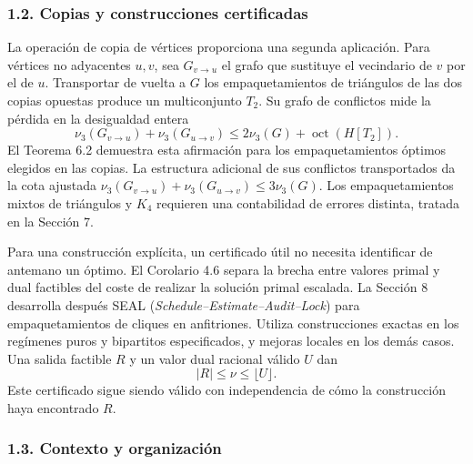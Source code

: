 \documentclass[spanish,11pt,a4paper]{article}
\begin{document}
\subsubsection{1.2. Copias y construcciones
certificadas}\label{copias-y-construcciones-certificadas}

La operación de copia de vértices proporciona una segunda aplicación.
Para vértices no adyacentes \(u,v\), sea \(G_{v\to u}\) el grafo que
sustituye el vecindario de \(v\) por el de \(u\). Transportar de vuelta
a \(G\) los empaquetamientos de triángulos de las dos copias opuestas
produce un multiconjunto \(T_2\). Su grafo de conflictos mide la pérdida
en la desigualdad entera \[
\nu_3(G_{v\to u})+\nu_3(G_{u\to v})
\le 2\nu_3(G)+\operatorname{oct}(H[T_2]).
\] El Teorema 6.2 demuestra esta afirmación para los empaquetamientos
óptimos elegidos en las copias. La estructura adicional de sus
conflictos transportados da la cota ajustada
\(\nu_3(G_{v\to u})+\nu_3(G_{u\to v})\le3\nu_3(G)\). Los
empaquetamientos mixtos de triángulos y \(K_4\) requieren una
contabilidad de errores distinta, tratada en la Sección 7.

Para una construcción explícita, un certificado útil no necesita
identificar de antemano un óptimo. El Corolario 4.6 separa la brecha
entre valores primal y dual factibles del coste de realizar la solución
primal escalada. La Sección 8 desarrolla después SEAL
(\emph{Schedule--Estimate--Audit--Lock}) para empaquetamientos de
cliques en anfitriones. Utiliza construcciones exactas en los regímenes
puros y bipartitos especificados, y mejoras locales en los demás casos.
Una salida factible \(R\) y un valor dual racional válido \(U\) dan \[
|R|\le\nu\le\lfloor U\rfloor.
\] Este certificado sigue siendo válido con independencia de cómo la
construcción haya encontrado \(R\).

\subsubsection{1.3. Contexto y
organización}\label{contexto-y-organizaciuxf3n}
\end{document}
